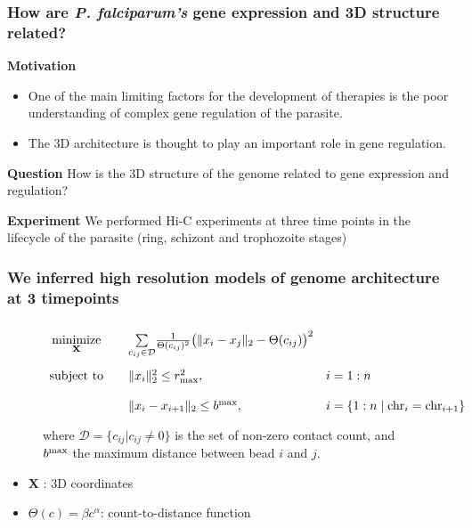 \documentclass[xcolor=dvipsnames]{beamer}
\begin{document}
\begin{frame}
\frametitle{How are {\em P. falciparum's} gene expression and 3D structure related?}
{\color{Blue} \textbf{Motivation}}
\begin{itemize}[label={$\bullet$}]

\item One of the main limiting factors for the
development of therapies is the poor understanding of complex gene regulation
of the parasite.
\item The 3D architecture is thought to play an important role in gene
regulation.
\end{itemize}

\vspace{1em}
{\color{Blue} \textbf{Question}} How is the 3D structure of the genome related
to gene expression and regulation?

\vspace{1em}
{\color{Blue} \textbf{Experiment}} We performed Hi-C experiments at three time
points in the lifecycle of the parasite (ring, schizont and trophozoite
stages)

\end{frame}

\begin{frame}
\frametitle{We inferred high resolution models of genome architecture at 3
timepoints}
\begin{figure}
\begin{equation*}
\renewcommand{\arraystretch}{2}
\begin{array}{ccll}
\underset{\mathbf{X}}{\text{minimize}} & &
\underset{c_{ij} \in \mathcal{D}}{\sum}
\frac{1}{\Theta(c_{ij})^2}\big(\|x_i - x_j\|_2 - \Theta(c_{ij})\big)^2 &\\
\text{subject to}
& & \|x_i\|_2^2 \leq r_{\rm max}^2, \quad
& i = 1:n\\
& & \|x_i - x_{i+1}\|_2 \leq b^{\rm max} , \quad
& i = \{1:n \;|\; {\rm chr}_i = {\rm chr}_{i+1}\}\\
\end{array}
\end{equation*}
where  $\mathcal{D} = \{ c_{ij} | c_{ij} \neq 0\}$ is
the set of non-zero contact count, and $b^{\rm max}$ the maximum distance
between bead $i$ and $j$.
\end{figure}

\vspace{2em}
{\tiny
\begin{multicols}{2}
\begin{itemize}[label={$\bullet$}]
\item $\mathbf{X}$ : 3D coordinates
\item $\Theta(c) = \beta c^\alpha$: count-to-distance function
\end{itemize}
\end{multicols}
}


\end{frame}
\end{document}
